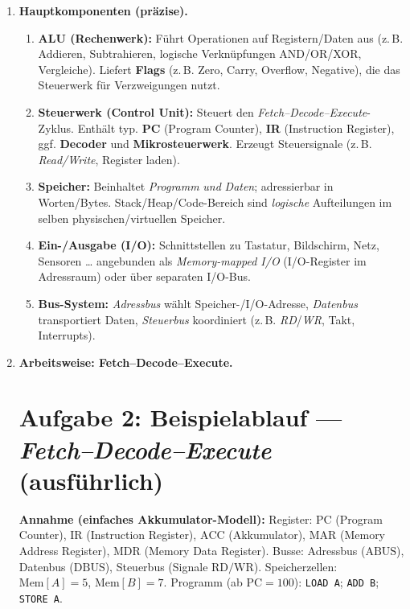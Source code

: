\documentclass[11pt,a4paper]{scrartcl}
\begin{document}
\begin{enumerate}[leftmargin=*,label=\textbf{Aufgabe~\arabic*:}, itemsep=0.9em]
		\item \textbf{Hauptkomponenten (präzise).}\quad
		\begin{enumerate}[label*=\alph*)]
			\item \textbf{ALU (Rechenwerk):} Führt Operationen auf Registern/Daten aus (z.\,B. Addieren, Subtrahieren, logische Verknüpfungen AND/OR/XOR, Vergleiche). Liefert \textbf{Flags} (z.\,B. Zero, Carry, Overflow, Negative), die das Steuerwerk für Verzweigungen nutzt.
			\item \textbf{Steuerwerk (Control Unit):} Steuert den \emph{Fetch–Decode–Execute}-Zyklus. Enthält typ. \textbf{PC} (Program Counter), \textbf{IR} (Instruction Register), ggf. \textbf{Decoder} und \textbf{Mikrosteuerwerk}. Erzeugt Steuersignale (z.\,B. \emph{Read/Write}, Register laden).
			\item \textbf{Speicher:} Beinhaltet \emph{Programm} \emph{und} \emph{Daten}; adressierbar in Worten/Bytes. Stack/Heap/Code-Bereich sind \emph{logische} Aufteilungen im selben physischen/virtuellen Speicher.
			\item \textbf{Ein-/Ausgabe (I/O):} Schnittstellen zu Tastatur, Bildschirm, Netz, Sensoren … angebunden als \emph{Memory-mapped I/O} (I/O-Register im Adressraum) oder über separaten I/O-Bus.
			\item \textbf{Bus-System:} \emph{Adressbus} wählt Speicher-/I/O-Adresse, \emph{Datenbus} transportiert Daten, \emph{Steuerbus} koordiniert (z.\,B. \emph{RD}/\emph{WR}, Takt, Interrupts).
		\end{enumerate}
		
		\item \textbf{Arbeitsweise: Fetch–Decode–Execute.}\quad
		\section*{Aufgabe 2: Beispielablauf — \emph{Fetch–Decode–Execute} (ausführlich)}
		
		\textbf{Annahme (einfaches Akkumulator-Modell):}
		Register: \(\mathrm{PC}\) (Program Counter), \(\mathrm{IR}\) (Instruction Register),
		\(\mathrm{ACC}\) (Akkumulator), \(\mathrm{MAR}\) (Memory Address Register),
		\(\mathrm{MDR}\) (Memory Data Register).
		Busse: Adressbus (\(\mathrm{ABUS}\)), Datenbus (\(\mathrm{DBUS}\)), Steuerbus (Signale \(\mathrm{RD}/\mathrm{WR}\)).
		Speicherzellen: \(\mathrm{Mem}[A]=5\), \(\mathrm{Mem}[B]=7\).
		Programm (ab \(\mathrm{PC}=100\)): \texttt{LOAD A}; \texttt{ADD B}; \texttt{STORE A}.
		

\end{enumerate}
\end{document}
